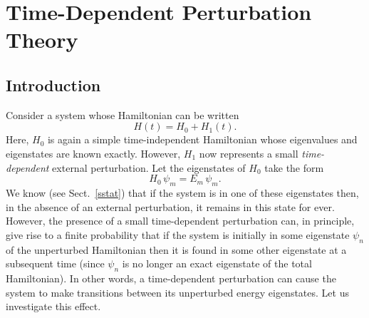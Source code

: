 \chapter{Time-Dependent Perturbation Theory}\label{s13}
\section{Introduction}
Consider a system whose Hamiltonian can be written
\begin{equation}
H(t) = H_0 + H_1(t).
\end{equation}
Here, $H_0$ is again a simple time-independent Hamiltonian whose eigenvalues and eigenstates are known exactly. However, $H_1$
 now represents a small {\em time-dependent}\/ external perturbation.
Let the eigenstates of $H_0$ take the form
\begin{equation}
H_0\,\psi_m = E_m\,\psi_m.
\end{equation}
We know (see Sect.~\ref{sstat}) that if the system is in one of these eigenstates then, in the absence of an external perturbation, it remains
in this state for ever. However,  the presence of a small time-dependent
perturbation can, in principle, give rise to a finite probability that if
the system is initially in some eigenstate $\psi_n$ of the unperturbed
Hamiltonian then it is found in some other eigenstate at a subsequent time
(since $\psi_n$ is no longer an exact eigenstate of the total
Hamiltonian). In other words, a time-dependent perturbation can cause
the system to make transitions between its unperturbed energy eigenstates.
Let us investigate this effect.

